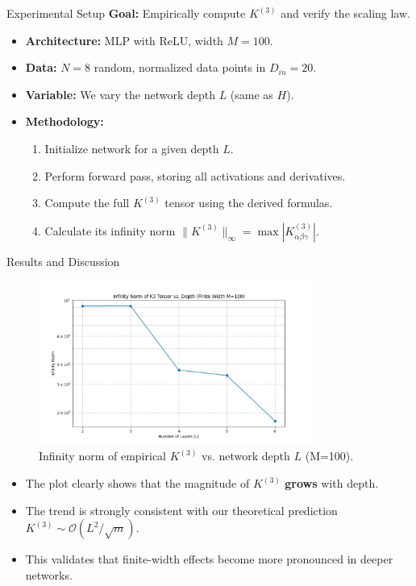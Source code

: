 \documentclass{beamer}
\newcommand{\Order}{\mathcal{O}}
\begin{document}
\begin{frame}{Experimental Setup}
\textbf{Goal:} Empirically compute $K^{(3)}$ and verify the scaling law.
\begin{itemize}
    \item \textbf{Architecture:} MLP with ReLU, width $M=100$.
    \item \textbf{Data:} $N=8$ random, normalized data points in $D_{in}=20$.
    \item \textbf{Variable:} We vary the network depth $L$ (same as $H$).
    \item \textbf{Methodology:}
        \begin{enumerate}
            \item Initialize network for a given depth $L$.
            \item Perform forward pass, storing all activations and derivatives.
            \item Compute the full $K^{(3)}$ tensor using the derived formulas.
            \item Calculate its infinity norm $\|K^{(3)}\|_\infty = \max |K^{(3)}_{\alpha\beta\gamma}|$.
        \end{enumerate}
\end{itemize}
\end{frame}

\begin{frame}{Results and Discussion}
\begin{figure}[h]
    \centering
    \includegraphics[width=0.8\textwidth]{../../../experiments/plots/k3_inf_norm_vs_L_finite_M100_N8_D20.png}
    \caption{Infinity norm of empirical $K^{(3)}$ vs. network depth $L$ (M=100).}
    \label{fig:k3_norm_vs_l}
\end{figure}
\begin{itemize}
    \item The plot clearly shows that the magnitude of $K^{(3)}$ \textbf{grows} with depth.
    \item The trend is strongly consistent with our theoretical prediction $K^{(3)} \sim \Order(L^2/\sqrt{m})$.
    \item This validates that finite-width effects become more pronounced in deeper networks.
\end{itemize}
\end{frame}
\end{document}
